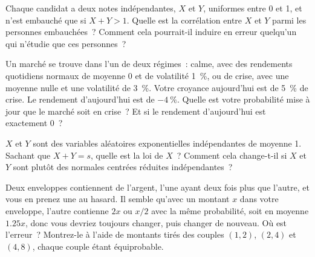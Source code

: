 \begin{question}\label{iq:iv1:conditional-probability-and-bayes:31}
Chaque candidat a deux notes indépendantes, $X$ et $Y$, uniformes entre 0 et 1, et n'est embauché que si $X + Y > 1$. Quelle est la corrélation entre $X$ et $Y$ parmi les personnes embauchées~? Comment cela pourrait-il induire en erreur quelqu'un qui n'étudie que ces personnes~?
\end{question}

\begin{question}\label{iq:iv1:conditional-probability-and-bayes:32}
Un marché se trouve dans l'un de deux régimes~: calme, avec des rendements quotidiens normaux de moyenne 0 et de volatilité 1~\%, ou de crise, avec une moyenne nulle et une volatilité de 3~\%. Votre croyance aujourd'hui est de 5~\% de crise. Le rendement d'aujourd'hui est de $-4~\%$. Quelle est votre probabilité mise à jour que le marché soit en crise~? Et si le rendement d'aujourd'hui est exactement 0~?
\end{question}

\begin{question}\label{iq:iv1:conditional-probability-and-bayes:33}
$X$ et $Y$ sont des variables aléatoires exponentielles indépendantes de moyenne 1. Sachant que $X + Y = s$, quelle est la loi de $X$~? Comment cela change-t-il si $X$ et $Y$ sont plutôt des normales centrées réduites indépendantes~?
\end{question}

\begin{question}\label{iq:iv1:conditional-probability-and-bayes:34}
Deux enveloppes contiennent de l'argent, l'une ayant deux fois plus que l'autre, et vous en prenez une au hasard. Il semble qu'avec un montant $x$ dans votre enveloppe, l'autre contienne $2x$ ou $x/2$ avec la même probabilité, soit en moyenne $1.25x$, donc vous devriez toujours changer, puis changer de nouveau. Où est l'erreur~? Montrez-le à l'aide de montants tirés des couples $(1, 2)$, $(2, 4)$ et $(4, 8)$, chaque couple étant équiprobable.
\end{question}

